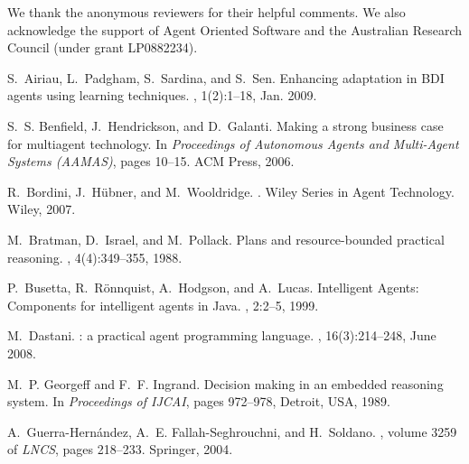 \documentclass{aamas2010_cameraReady}
\begin{document}
We thank the anonymous reviewers for their helpful comments. We also
acknowledge the support of Agent Oriented Software and the Australian Research Council (under
grant LP0882234).

%
% 
% 


\small

\begin{thebibliography}{10}

\medskip

S.~Airiau, L.~Padgham, S.~Sardina, and S.~Sen.
\newblock Enhancing adaptation in {BDI} agents using learning techniques.
, 1(2):1--18, Jan. 2009.

S.~S. Benfield, J.~Hendrickson, and D.~Galanti.
\newblock Making a strong business case for multiagent technology.
\newblock In {\em Proceedings of Autonomous Agents and Multi-Agent Systems
  (AAMAS)}, pages 10--15. ACM Press, 2006.

R.~Bordini, J.~H{\"u}bner, and M.~Wooldridge.
.
\newblock Wiley Series in Agent Technology. Wiley, 2007.

M.~Bratman, D.~Israel, and M.~Pollack.
\newblock Plans and resource-bounded practical reasoning.
, 4(4):349--355, 1988.

P.~Busetta, R.~R{\"o}nnquist, A.~Hodgson, and A.~Lucas.
 {I}ntelligent {A}gents: {C}omponents for intelligent agents in
  {J}ava.
, 2:2--5, 1999.

M.~Dastani.
: a practical agent programming language.
, 16(3):214--248, June
  2008.

M.~P. Georgeff and F.~F. Ingrand.
\newblock Decision making in an embedded reasoning system.
\newblock In {\em Proceedings of IJCAI}, pages 972--978, Detroit, USA, 1989.

A.~Guerra-Hern\'andez, A.~E. Fallah-Seghrouchni, and H.~Soldano.
, volume 3259 of {\em
  LNCS}, pages 218--233.
\newblock Springer, 2004.


\end{thebibliography}
\end{document}
